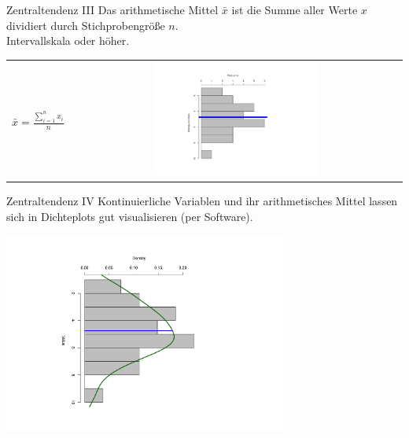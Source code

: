 \begin{frame}
  {Zentraltendenz III}
  Das \alert{arithmetische Mittel} $\bar{x}$ ist die Summe aller Werte $x$\\
  dividiert durch Stichprobengröße $n$.\\
  \alert{Intervallskala oder höher.}
  \vspace{-2cm}
  \begin{center}
    \begin{tabular}[!h]{cc}
      \vspace{1.5cm} & \multirow{3}{*}{\includegraphics[width=0.5\textwidth,angle=90]{graphics/mean}} \\
      $\bar{x}=\frac{\sum\limits_{i=1}^{n}x_i}{n}$ \hspace{1.5cm} &  \\
      \vspace{1.5cm} & \\
    \end{tabular}
  \end{center}
\end{frame}

\begin{frame}
  {Zentraltendenz IV}
  Kontinuierliche Variablen und ihr arithmetisches Mittel lassen sich in \alert{Dichteplots} gut visualisieren (per Software).
    \vspace{-2cm}
  \begin{center}
    \includegraphics[width=0.7\textwidth,angle=90]{graphics/meandens}
  \end{center}
\end{frame}


